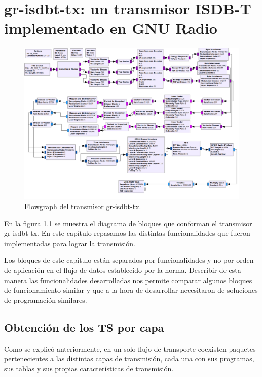 \chapter{gr-isdbt-tx: un transmisor ISDB-T implementado en GNU Radio}

\begin{figure}[h!]
	\centering
	\includegraphics[scale=0.3]{figuras/cap05/flowgraphEdited}
	\caption{\label{f:flowgraphEdited} Flowgraph del transmisor gr-isdbt-tx.}
\end{figure}

En la figura \ref{f:flowgraphEdited} se muestra el diagrama de bloques que conforman el transmisor gr-isdbt-tx. En este capítulo repasamos las distintas funcionalidades que fueron implementadas para lograr la transmisión.

Los bloques de este capitulo están separados por funcionalidades y no por orden de aplicación en el flujo de datos establecido por la norma. Describir de esta manera las funcionalidades desarrolladas nos permite comparar algunos bloques de funcionamiento similar y que a la hora de desarrollar necesitaron de soluciones de programación similares.

\section{Obtención de los TS por capa}

Como se explicó anteriormente, en un solo flujo de transporte coexisten paquetes pertenecientes a las distintas capas de transmisión, cada una con sus programas, sus tablas y sus propias características de transmisión.

